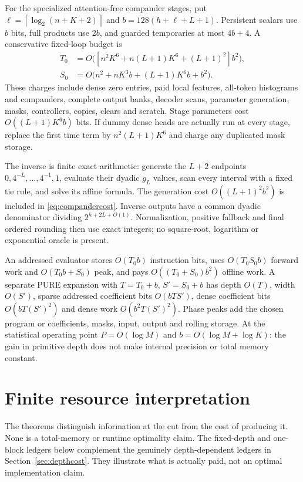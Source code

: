 \documentclass[11pt,letterpaper]{article}
\theoremstyle{definition}\newtheorem{definition}[theorem]{Definition}
\theoremstyle{remark}\newtheorem{remark}[theorem]{Remark}
\newcommand{\ceil}[1]{\left\lceil #1\right\rceil}
\begin{document}
For the specialized attention-free compander stages, put
$\ell=\ceil{\log_2(n+K+2)}$ and $b=128(h+\ell+L+1)$.
Persistent scalars use $b$ bits, full products use $2b$, and guarded temporaries at most $4b+4$. A conservative fixed-loop budget is
\begin{equation}\label{eq:compandercost}
 \begin{aligned}
 T_0&=O\bigl([n^2K^6+n(L+1)K^6+(L+1)^2]b^2\bigr),\\
 S_0&=O\bigl(n^2+nK^3b+(L+1)K^6b+b^2\bigr).
 \end{aligned}
\end{equation}
These charges include dense zero entries, paid local features, all-token histograms and companders, complete output banks, decoder scans, parameter generation, masks, controllers, copies, clears and scratch. Stage parameters cost $O((L+1)K^6b)$ bits. If dummy dense heads are actually run at every stage, replace the first time term by $n^2(L+1)K^6$ and charge any duplicated mask storage.

The inverse is finite exact arithmetic: generate the $L+2$ endpoints $0,4^{-L},\ldots,4^{-1},1$, evaluate their dyadic $g_L$ values, scan every interval with a fixed tie rule, and solve its affine formula. The generation cost $O((L+1)^2b^2)$ is included in \eqref{eq:compandercost}. Inverse outputs have a common dyadic denominator dividing $2^{h+2L+O(1)}$. Normalization, positive fallback and final ordered rounding then use exact integers; no square-root, logarithm or exponential oracle is present.

An addressed evaluator stores $O(T_0b)$ instruction bits, uses
$O(T_0S_0b)$ forward work and $O(T_0b+S_0)$ peak, and pays
$O((T_0+S_0)b^2)$ offline work.
A separate PURE expansion with $T=T_0+b$, $S'=S_0+b$ has depth $O(T)$, width $O(S')$, sparse addressed coefficient bits $O(bTS')$, dense coefficient bits $O(bT(S')^2)$ and dense work $O(b^2T(S')^2)$. Phase peaks add the chosen program or coefficients, masks, input, output and rolling storage. At the statistical operating point $P=O(\log M)$ and $b=O(\log M+\log K)$: the gain in primitive depth does not make internal precision or total memory constant.

\section{Finite resource interpretation}\label{sec:costs}
The theorems distinguish information at the cut from the cost of producing it. None is a total-memory or runtime optimality claim. The fixed-depth and one-block ledgers below complement the genuinely depth-dependent ledgers in Section~\ref{sec:depthcost}. They illustrate what is actually paid, not an optimal implementation claim.
\end{document}
